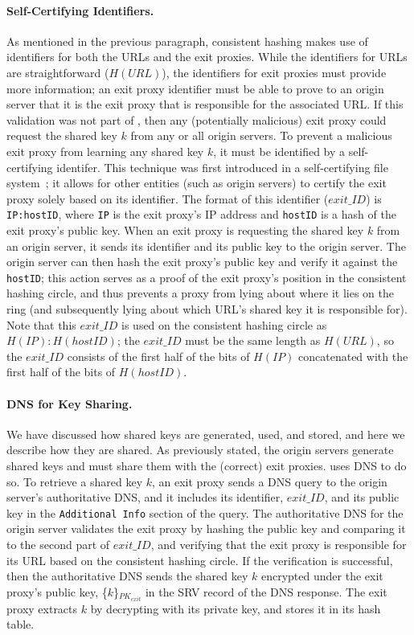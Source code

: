 \paragraph{Self-Certifying Identifiers.}
As mentioned in the previous paragraph, consistent hashing makes use of identifiers for both the URLs and 
the exit proxies.  While the identifiers for URLs are straightforward ($H(URL)$), the identifiers for exit 
proxies must provide more information; an exit proxy identifier must be able to prove to an origin server that 
it is the exit proxy that is responsible for the associated URL.  If this validation was not part of \system{}, 
then any (potentially malicious) exit proxy could request the shared key $k$ from any or all origin servers.  To 
prevent a malicious exit proxy from learning any shared key $k$, it must be identified by a self-certifying 
identifer.  This technique was first introduced in a self-certifying file system~\cite{mazieres2000self}; it allows
for other entities (such as origin servers) to certify the exit proxy solely based on its identifier.  The format 
of this identifier ($exit\_ID$) is {\tt IP:hostID}, where {\tt IP} is the exit proxy's IP address and {\tt hostID} 
is a hash of the exit proxy's public key.  When an exit proxy is requesting the shared key $k$ from an origin server, 
it sends its identifier and its public key to the origin server.  The origin server
can then hash the exit proxy's 
public key and verify it against the {\tt hostID}; this action serves as a proof
of the exit proxy's position in the consistent hashing
circle, and thus prevents a proxy from lying about where it lies on the ring (and subsequently lying about which 
URL's shared key it is responsible for).  Note that this $exit\_ID$ is used on the consistent hashing circle as $H(IP):H(hostID)$; the 
$exit\_ID$ must be the same length as $H(URL)$, so the $exit\_ID$ consists of the first half of the bits of $H(IP)$ concatenated 
with the first half of the bits of $H(hostID)$.

\paragraph{DNS for Key Sharing.}
We have discussed how shared keys are generated, used, and stored, and here we describe how they are shared.  As previously 
stated, the origin servers generate shared keys and must share them with the (correct) exit proxies.  \system{} uses DNS
to do so.  To retrieve a shared key $k$, an exit proxy sends a DNS query to the origin server's authoritative DNS, and 
it includes its identifier, $exit\_ID$, and its public key in the {\tt Additional Info} section of the query.  The 
authoritative DNS for the origin server validates the exit proxy by hashing the public key and comparing it to the 
second part of $exit\_ID$, and verifying that the exit proxy is responsible for its URL based on the consistent 
hashing circle.  If the verification is successful, then the authoritative DNS sends the shared key $k$ encrypted 
under the exit proxy's public key, \{$k$\}$_{PK_{exit}}$ in the SRV record of the DNS response.  The exit proxy 
extracts $k$ by decrypting with its private key, and stores it in its hash table.

